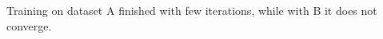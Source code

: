 \begin{answer}
    Training on dataset A finished with few iterations, while with B it does not converge.
\end{answer}
